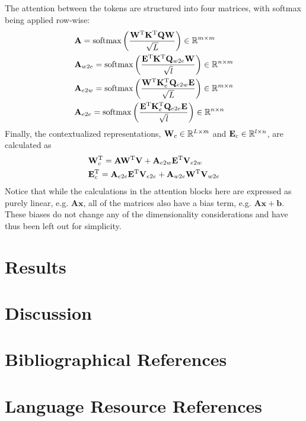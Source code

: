 \documentclass[10pt, a4paper]{article}
\newcommand{\softmax}{\operatorname{softmax}}
\begin{document}
The attention between the tokens are structured into four matrices, with softmax being applied row-wise:
\begin{align*}
        &\mathbf A = \softmax\left(\frac{\transpose{\mathbf W}\transpose{\mathbf K}\mathbf Q\mathbf W}{\sqrt{L}}\right)\in\RR^{m\times m}\\
        &\mathbf A_{w2e} = \softmax\left(\frac{\transpose{\mathbf E}\transpose{\mathbf K}\mathbf Q_{w2e}\mathbf W}{\sqrt{l}}\right)\in\RR^{n\times m}\\
        &\mathbf A_{e2w} = \softmax\left(\frac{\transpose{\mathbf W}\transpose{\mathbf K_e}\mathbf Q_{e2w}\mathbf E}{\sqrt{L}}\right)\in\RR^{m\times n}\\
        &\mathbf A_{e2e} = \softmax\left(\frac{\transpose{\mathbf E}\transpose{\mathbf K_e}\mathbf Q_{e2e}\mathbf E}{\sqrt{l}}\right)\in\RR^{n\times n}
\end{align*}
Finally, the contextualized representations, $ \mathbf W_{c}\in\mathbb R^{L\times m} $ and $ \mathbf E_{c}\in\mathbb R^{l\times n} $, are calculated as
\begin{align*}
    &\mathbf W_c^{\textup T} = \mathbf A\mathbf W^{\textup T}\mathbf V
        + \mathbf A_{e2w}\mathbf E^{\textup T}\mathbf V_{e2w} \\
        &\mathbf E_c^{\textup T} = \mathbf A_{e2e}\mathbf E^{\textup T}\mathbf V_{e2e}
        + \mathbf A_{w2e}\mathbf W^{\textup T}\mathbf V_{w2e}
\end{align*}
Notice that while the calculations in the attention blocks here are expressed as purely linear, e.g. $ \mathbf A\mathbf x $, all of the matrices also have a bias term, e.g. $ \mathbf A\mathbf x+\mathbf b $.
These biases do not change any of the dimensionality considerations and have thus been left out for simplicity.

\section{Results}

\section{Discussion}

\section{Bibliographical References}\label{reference}




\section{Language Resource References}
\label{lr:ref}
\end{document}
